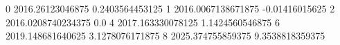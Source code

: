 0 2016.26123046875 0.2403564453125
1 2016.0067138671875 -0.01416015625
2 2016.0208740234375 0.0
4 2017.163330078125 1.1424560546875
6 2019.148681640625 3.1278076171875
8 2025.374755859375 9.3538818359375
